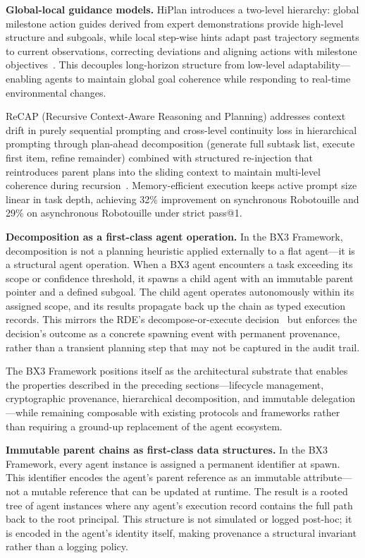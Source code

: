 \textbf{Global-local guidance models.} HiPlan introduces a two-level hierarchy: global milestone action guides derived from expert demonstrations provide high-level structure and subgoals, while local step-wise hints adapt past trajectory segments to current observations, correcting deviations and aligning actions with milestone objectives~\cite{hiplan2025}. This decouples long-horizon structure from low-level adaptability---enabling agents to maintain global goal coherence while responding to real-time environmental changes.

ReCAP (Recursive Context-Aware Reasoning and Planning) addresses context drift in purely sequential prompting and cross-level continuity loss in hierarchical prompting through plan-ahead decomposition (generate full subtask list, execute first item, refine remainder) combined with structured re-injection that reintroduces parent plans into the sliding context to maintain multi-level coherence during recursion~\cite{recap2025}. Memory-efficient execution keeps active prompt size linear in task depth, achieving 32\% improvement on synchronous Robotouille and 29\% on asynchronous Robotouille under strict pass@1.

\textbf{Decomposition as a first-class agent operation.} In the BX3 Framework, decomposition is not a planning heuristic applied externally to a flat agent---it is a structural agent operation. When a BX3 agent encounters a task exceeding its scope or confidence threshold, it spawns a child agent with an immutable parent pointer and a defined subgoal. The child agent operates autonomously within its assigned scope, and its results propagate back up the chain as typed execution records. This mirrors the RDE's decompose-or-execute decision~\cite{rde2024} but enforces the decision's outcome as a concrete spawning event with permanent provenance, rather than a transient planning step that may not be captured in the audit trail.


The BX3 Framework positions itself as the architectural substrate that enables the properties described in the preceding sections---lifecycle management, cryptographic provenance, hierarchical decomposition, and immutable delegation---while remaining composable with existing protocols and frameworks rather than requiring a ground-up replacement of the agent ecosystem.

\textbf{Immutable parent chains as first-class data structures.} In the BX3 Framework, every agent instance is assigned a permanent identifier at spawn. This identifier encodes the agent's parent reference as an immutable attribute---not a mutable reference that can be updated at runtime. The result is a rooted tree of agent instances where any agent's execution record contains the full path back to the root principal. This structure is not simulated or logged post-hoc; it is encoded in the agent's identity itself, making provenance a structural invariant rather than a logging policy.

